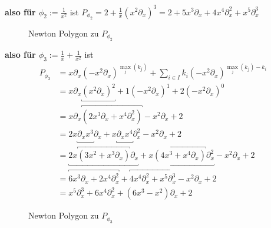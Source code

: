\textbf{also für $\phi_2:=\frac{1}{x^2}$} ist
$P_{\phi_2}=2+\frac{1}{x}(x^2\partial_x)^{3}
=2+5x^3\partial_x+4x^{4}\partial_x^2+x^5\partial_x^3$
\begin{figure}[H]
\caption{Newton Polygon zu $P_{\phi_2}$}
\begin{center}
\end{center}
\end{figure}

\textbf{also für
$\phi_3:=\frac{1}{x}+\frac{1}{x^2}$} ist
\begin{align*}
P_{\phi_3} &=x\partial_x(-x^2\partial_x)^{\max_j(k_j)}
    +\sum_{i\in I} k_i(-x^2\partial_x)^{\max_j(k_j)-k_i}\\
  &=x\partial_x\underbracket{(x^2\partial_x)^{2}}
    +1(-x^2\partial_x)^{1}+2(-x^2\partial_x)^{0}\\
  &=x\partial_x \overbracket{(2x^3\partial_x+x^4\partial_x^2)}
    -x^2\partial_x+2\\
  &=2x\underbracket{\partial_xx^3}\partial_x
    +x\underbracket{\partial_xx^4}\partial_x^2
    -x^2\partial_x+2\\
  &=\underbracket{2x\overbracket{(3x^2+x^3\partial_x)}\partial_x}
    +\underbracket{x\overbracket{(4x^3+x^4\partial_x)}\partial_x^2}
    -x^2\partial_x+2\\
  &=\overbracket{6x^3\partial_x+2x^4\partial_x^2}
    +\overbracket{4x^4\partial_x^2+x^5\partial_x^3}
    -x^2\partial_x+2\\
  &= x^5\partial_x^3+6x^4\partial_x^2+(6x^3-x^2)\partial_x+2
\end{align*}
\begin{figure}[H]
\caption{Newton Polygon zu $P_{\phi_3}$}
\begin{center}
\end{center}
\end{figure}

